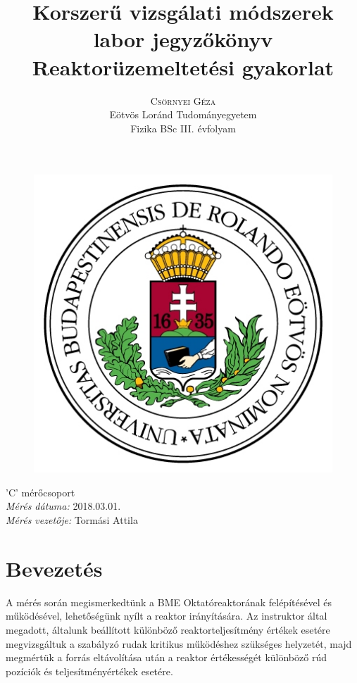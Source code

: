 \documentclass[12pt,a4paper]{article}
\title{\huge{Korszerű vizsgálati módszerek labor jegyzőkönyv}\\ \vspace{20pt}
\textbf{Reaktorüzemeltetési gyakorlat} \\}
\author{\Large{\textsc{Csörnyei Géza}} \vspace{10pt}\\
	\textrm{Eötvös Loránd Tudományegyetem}\\
	\textrm{Fizika BSc III. évfolyam}
	}
\date{}
\begin{document}
\addtolength{\voffset}{-1.5cm}
\addtolength{\textheight}{1.5cm}
\begin{titlepage}
\maketitle

\begin{figure}[!htb]
\centering
  \includegraphics[scale=0.6]{eltecimer.jpg}
\end{figure}

\hfil \Large{'C' mérőcsoport}\hfil  \\
\vspace*{2pt}
\hfil \Large{\emph{Mérés dátuma:} 2018.03.01.}\hfil \\
\vspace*{2pt}
\hfil \hspace*{45pt} \Large{\emph{Mérés vezetője:} Tormási Attila}\hfil
\thispagestyle{empty}
\end{titlepage}

\section{Bevezetés}
\hspace*{10pt} A mérés során megismerkedtünk a BME Oktatóreaktorának felépítésével és működésével, lehetőségünk nyílt a reaktor irányítására. Az instruktor által megadott, általunk beállított különböző reaktorteljesítmény értékek esetére megvizsgáltuk a szabályzó rudak kritikus működéshez szükséges helyzetét, majd megmértük a forrás eltávolítása után a reaktor értékességét különböző rúd pozíciók és teljesítményértékek esetére.
\end{document}
